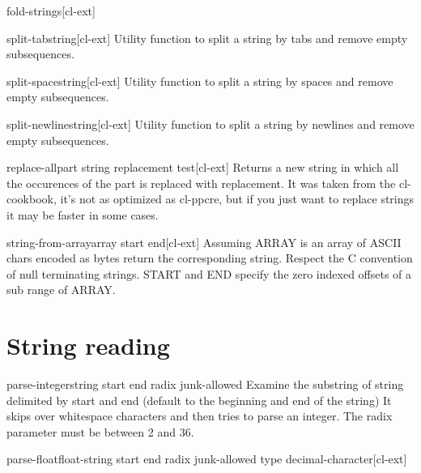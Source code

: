 \documentclass[10pt,english]{book}
\begin{document}
\begin{function}{fold-strings}{}[cl-ext]
  
\end{function}

\begin{function}{split-tab}{string}[cl-ext]
  Utility function to split a string by tabs and remove empty
  subsequences.
\end{function}

\begin{function}{split-space}{string}[cl-ext]
  Utility function to split a string by spaces and remove empty
  subsequences.
\end{function}

\begin{function}{split-newline}{string}[cl-ext]
  Utility function to split a string by newlines and remove empty
  subsequences.
\end{function}

\begin{function}{replace-all}{part string replacement \key test}[cl-ext]
  Returns a new string in which all the occurences of the part is
  replaced with replacement. It was taken from the cl-cookbook, it's
  not as optimized as cl-ppcre, but if you just want to replace
  strings it may be faster in some cases.
\end{function}

\begin{function}{string-from-array}{array \key start end}[cl-ext]
  Assuming ARRAY is an array of ASCII chars encoded as bytes return
the corresponding string. Respect the C convention of null terminating
strings. START and END specify the zero indexed offsets of a sub range
of ARRAY.
\end{function}

\section{String reading}
\label{sec:string-reading}

\begin{function}{parse-integer}{string \key start end radix junk-allowed}
  Examine the substring of string delimited by start and end
  (default to the beginning and end of the string)  It skips over
  whitespace characters and then tries to parse an integer. The
  radix parameter must be between 2 and 36.
\end{function}

\begin{function}{parse-float}{float-string \key start end radix junk-allowed type decimal-character}[cl-ext]
\end{function}
\end{document}
